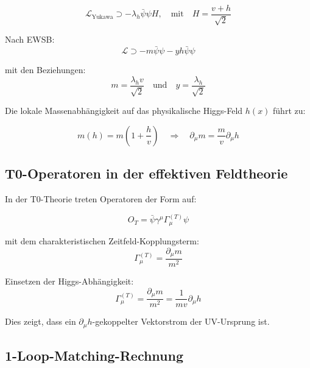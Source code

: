 	\begin{equation}
		\mathcal{L}_{\text{Yukawa}} \supset -\lambda_h \bar{\psi}\psi H, \quad \text{mit} \quad H = \frac{v + h}{\sqrt{2}}
	\end{equation}
	
	Nach EWSB:
	\begin{equation}
		\mathcal{L} \supset -m \bar{\psi}\psi - y h \bar{\psi}\psi
	\end{equation}
	
	mit den Beziehungen:
	\begin{equation}
		m = \frac{\lambda_h v}{\sqrt{2}} \quad \text{und} \quad y = \frac{\lambda_h}{\sqrt{2}}
	\end{equation}
	
	Die lokale Massenabhängigkeit auf das physikalische Higgs-Feld $h(x)$ führt zu:
	
	\begin{equation}
		m(h) = m\left(1 + \frac{h}{v}\right) \quad \Rightarrow \quad \partial_\mu m = \frac{m}{v}\partial_\mu h
	\end{equation}
	
	\subsection{T0-Operatoren in der effektiven Feldtheorie}
	\label{subsec:t0_operators}
	
	In der T0-Theorie treten Operatoren der Form auf:
	
	\begin{equation}
		O_T = \bar{\psi}\gamma^\mu\Gamma_\mu^{(T)}\psi
	\end{equation}
	
	mit dem charakteristischen Zeitfeld-Kopplungsterm:
	\begin{equation}
		\Gamma_\mu^{(T)} = \frac{\partial_\mu m}{m^2}
	\end{equation}
	
	Einsetzen der Higgs-Abhängigkeit:
	\begin{equation}
		\Gamma_\mu^{(T)} = \frac{\partial_\mu m}{m^2} = \frac{1}{mv}\partial_\mu h
	\end{equation}
	
	Dies zeigt, dass ein $\partial_\mu h$-gekoppelter Vektorstrom der UV-Ursprung ist.
	
	\subsection{1-Loop-Matching-Rechnung}
	\label{subsec:one_loop_matching}
	

